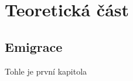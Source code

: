 \part{Teoretická část}

\hypertarget{emigrace}{%
\chapter{Emigrace}\label{emigrace}}

Tohle je první kapitola~\parencite{nespor05}
